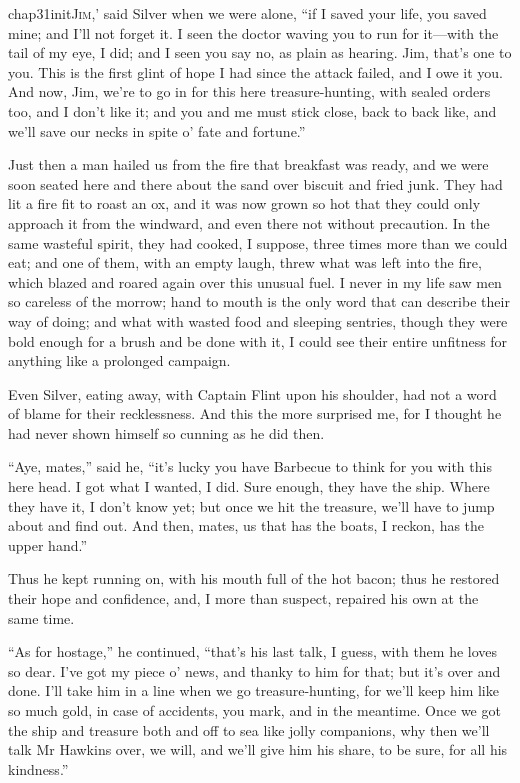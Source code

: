 
   \lettrine[ante=`,lines=4,image=true]{chap31initJ}{im},' said Silver when we were alone, \enquote{if I saved your life, you saved mine; and I’ll not forget it. I seen the doctor waving you to run for it---with the tail of my eye, I did; and I seen you say no, as plain as hearing. Jim, that’s one to you. This is the first glint of hope I had since the attack failed, and I owe it you. And now, Jim, we’re to go in for this here treasure-hunting, with sealed orders too, and I don’t like it; and you and me must stick close, back to back like, and we’ll save our necks in spite o’ fate and fortune.}

Just then a man hailed us from the fire that breakfast was ready, and we were soon seated here and there about the sand over biscuit and fried junk. They had lit a fire fit to roast an ox, and it was now grown so hot that they could only approach it from the windward, and even there not without precaution. In the same wasteful spirit, they had cooked, I suppose, three times more than we could eat; and one of them, with an empty laugh, threw what was left into the fire, which blazed and roared again over this unusual fuel. I never in my life saw men so careless of the morrow; hand to mouth is the only word that can describe their way of doing; and what with wasted food and sleeping sentries, though they were bold enough for a brush and be done with it, I could see their entire unfitness for anything like a prolonged campaign.

Even Silver, eating away, with Captain Flint upon his shoulder, had not a word of blame for their recklessness. And this the more surprised me, for I thought he had never shown himself so cunning as he did then.

\enquote{Aye, mates,} said he, \enquote{it’s lucky you have Barbecue to think for you with this here head. I got what I wanted, I did. Sure enough, they have the ship. Where they have it, I don’t know yet; but once we hit the treasure, we’ll have to jump about and find out. And then, mates, us that has the boats, I reckon, has the upper hand.}

Thus he kept running on, with his mouth full of the hot bacon; thus he restored their hope and confidence, and, I more than suspect, repaired his own at the same time.

\enquote{As for hostage,} he continued, \enquote{that’s his last talk, I guess, with them he loves so dear. I’ve got my piece o’ news, and thanky to him for that; but it’s over and done. I’ll take him in a line when we go treasure-hunting, for we’ll keep him like so much gold, in case of accidents, you mark, and in the meantime. Once we got the ship and treasure both and off to sea like jolly companions, why then we’ll talk Mr Hawkins over, we will, and we’ll give him his share, to be sure, for all his kindness.}

